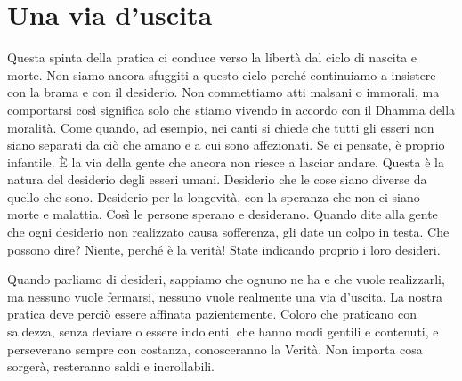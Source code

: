 \section{Una via d'uscita}

Questa spinta della pratica ci conduce verso la libertà dal ciclo di
nascita e morte. Non siamo ancora sfuggiti a questo ciclo perché
continuiamo a insistere con la brama e con il desiderio. Non commettiamo
atti malsani o immorali, ma comportarsi così significa solo che stiamo
vivendo in accordo con il Dhamma della moralità. Come quando, ad
esempio, nei canti si chiede che tutti gli esseri non siano separati da
ciò che amano e a cui sono affezionati. Se ci pensate, è proprio
infantile. È la via della gente che ancora non riesce a lasciar andare.
Questa è la natura del desiderio degli esseri umani. Desiderio che le
cose siano diverse da quello che sono. Desiderio per la longevità, con
la speranza che non ci siano morte e malattia. Così le persone sperano e
desiderano. Quando dite alla gente che ogni desiderio non realizzato
causa sofferenza, gli date un colpo in testa. Che possono dire? Niente,
perché è la verità! State indicando proprio i loro desideri.

Quando parliamo di desideri, sappiamo che ognuno ne ha e che vuole
realizzarli, ma nessuno vuole fermarsi, nessuno vuole realmente una via
d'uscita. La nostra pratica deve perciò essere affinata pazientemente.
Coloro che praticano con saldezza, senza deviare o essere indolenti, che
hanno modi gentili e contenuti, e perseverano sempre con costanza,
conosceranno la Verità. Non importa cosa sorgerà, resteranno saldi e
incrollabili.

